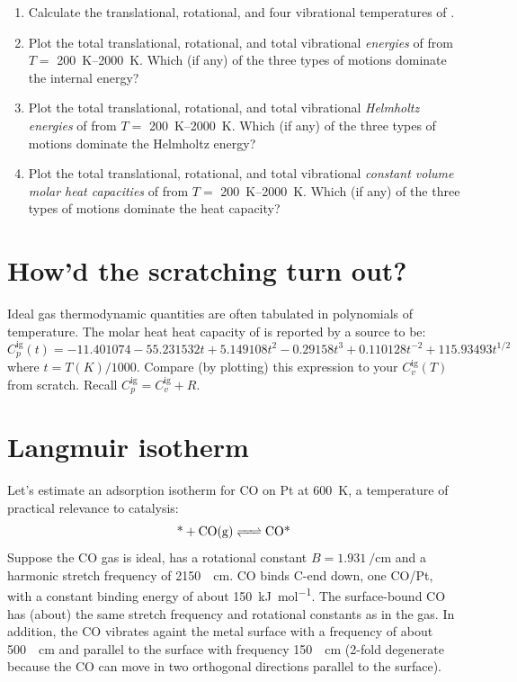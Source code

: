 \documentclass[11pt]{article}
\begin{document}
\begin{enumerate}
\item Calculate the translational, rotational, and four vibrational temperatures of .
\item Plot the total translational, rotational, and total vibrational \emph{energies} of
 from \(T=\) \SIrange[range-units = single]{200}{2000}{K}.  Which (if any) of the three types of motions dominate
the internal energy?
\item Plot the total translational, rotational, and total vibrational \emph{Helmholtz energies} of
 from \(T=\) \SIrange[range-units = single]{200}{2000}{K}.  Which (if any) of the three types of motions dominate
the Helmholtz energy?
\item Plot the total translational, rotational, and total vibrational \emph{constant
  volume molar heat capacities} of
 from \(T=\) \SIrange[range-units = single]{200}{2000}{K}.  Which (if any) of the three types of motions dominate
the heat capacity?
\end{enumerate}
\section{How'd the scratching turn out?}
\label{sec:org6d33433}
Ideal gas thermodynamic quantities are often tabulated in polynomials of
  temperature.  The molar heat heat capacity of  is reported by a source to be:
\begin{equation*}
  C_p^\text{ig}(t) = -11.401074 - 55.231532t+5.149108t^2-0.29158t^3+0.110128t^{-2}+115.93493t^{1/2}
\end{equation*}
\noindent where \(t=T(K)/1000\).  Compare (by plotting) this expression to your
\(C_v^\text{ig}(T)\) from scratch.  Recall \(C_p^\text{ig} = C_v^\text{ig}+R\).

\section{Langmuir isotherm}
\label{sec:org29ff83e}
Let's estimate an adsorption isotherm for CO on Pt at \SI{600}{K}, a temperature of practical relevance to catalysis:
\begin{equation}
  \ce{\text{*} + CO (g) <=> CO\text{*}}
\end{equation}
\noindent Suppose the CO gas is ideal, has a rotational constant
  \(B=\SI{1.931}{\per\centi\meter}\) and a harmonic  stretch frequency of
  \SI{2150}{\per\centi\meter}.  CO binds C-end down, one CO/Pt, with a constant binding
  energy of about \SI{150}{\kilo\joule\per\mole}.  The surface-bound CO has (about) the
  same  stretch frequency and rotational constants as in the gas. In addition, the
  CO vibrates againt the metal surface with a frequency of about
  \SI{500}{\per\centi\meter} and parallel to the surface with frequency
  \SI{150}{\per\centi\meter} (2-fold degenerate because the CO can move in two orthogonal
  directions parallel to the surface).
\end{document}
